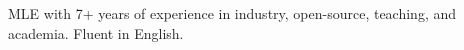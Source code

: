 \documentclass[10pt,a4paper,ragged2e,withhyper]{altacv}
\begin{document}


\makecvheader


\smallskip
MLE with 7+ years of experience in industry, open-source, teaching, and academia. Fluent in English.

\begin{paracol}{2}







\switchcolumn





% 

\end{paracol}
\end{document}
